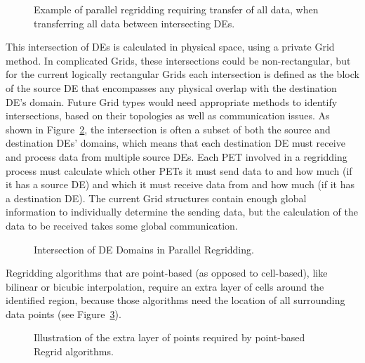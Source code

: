 \begin{center}
\begin{figure}
\caption{Example of parallel regridding requiring transfer of all data,
         when transferring all data between intersecting DEs. }
\label{fig:RToCRegrid}
\end{figure}
\end{center}

This intersection of DEs is calculated in physical space, using a private Grid
method.  In complicated Grids, these intersections could be non-rectangular, but
for the current logically rectangular Grids each intersection is defined as the
block of the source DE that encompasses any physical overlap with the destination
DE's domain.  Future Grid types would need appropriate methods to identify
intersections, based on their topologies as well as communication issues.  As
shown in Figure~\ref{fig:RegridIntersection}, 
the intersection is often a subset of both the source and destination DEs'
domains, which means that each destination DE must receive and process data from
multiple source DEs.  Each PET involved in a regridding process must calculate
which other PETs it must send data to and how much (if it has a source DE) and
which it must receive data from and how much (if it has a destination DE).  The
current Grid structures contain enough global information to individually
determine the sending data, but the calculation of the data to be received takes
some global communication.

\begin{center}
\begin{figure}
\caption{Intersection of DE Domains in Parallel Regridding. }
\label{fig:RegridIntersection}
\end{figure}
\end{center}

Regridding algorithms that are point-based (as opposed to cell-based), like
bilinear or bicubic interpolation, require an extra layer of cells around the
identified region, because those algorithms need the location of all surrounding
data points (see Figure~\ref{fig:RegridExtraLayer}).

\begin{center}
\begin{figure} 
\caption{Illustration of the extra layer of points required by point-based Regrid
          algorithms. }
\label{fig:RegridExtraLayer}
\end{figure}
\end{center}

